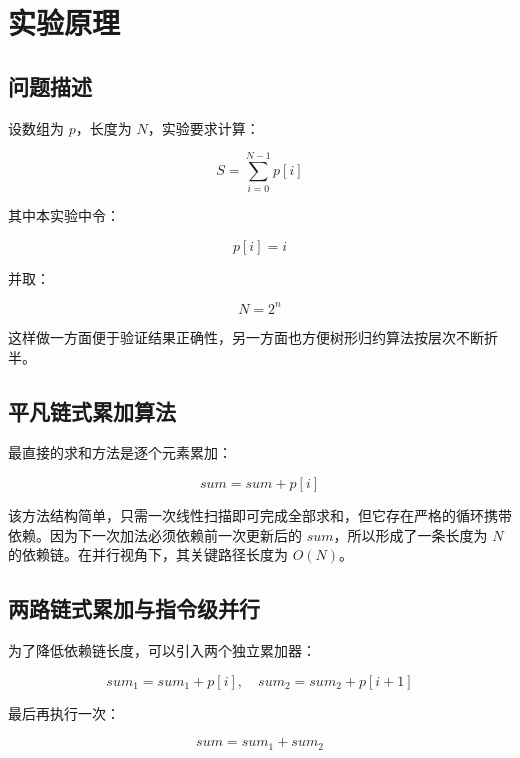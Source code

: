 \documentclass[a4paper,12pt]{ctexart}
\begin{document}
\section{实验原理}

\subsection{问题描述}

设数组为 $p$，长度为 $N$，实验要求计算：

\begin{equation}
S=\sum_{i=0}^{N-1}p[i]
\end{equation}

其中本实验中令：

\begin{equation}
p[i]=i
\end{equation}

并取：

\begin{equation}
N=2^n
\end{equation}

这样做一方面便于验证结果正确性，另一方面也方便树形归约算法按层次不断折半。

\subsection{平凡链式累加算法}

最直接的求和方法是逐个元素累加：

\begin{equation}
sum=sum+p[i]
\end{equation}

该方法结构简单，只需一次线性扫描即可完成全部求和，但它存在严格的循环携带依赖。因为下一次加法必须依赖前一次更新后的 $sum$，所以形成了一条长度为 $N$ 的依赖链。在并行视角下，其关键路径长度为 $O(N)$。

\subsection{两路链式累加与指令级并行}

为了降低依赖链长度，可以引入两个独立累加器：

\begin{equation}
sum_1=sum_1+p[i],\quad sum_2=sum_2+p[i+1]
\end{equation}

最后再执行一次：

\begin{equation}
sum=sum_1+sum_2
\end{equation}
\end{document}

